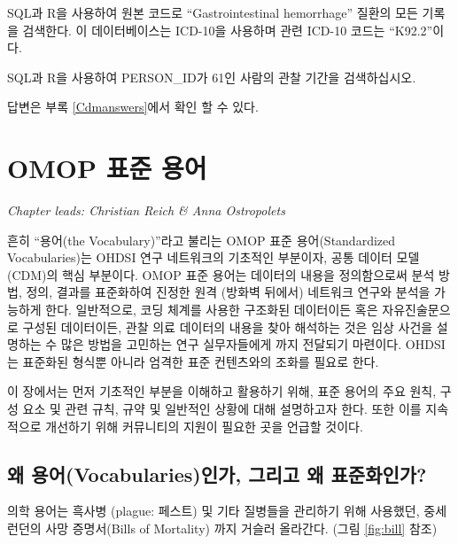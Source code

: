 \documentclass[11pt]{book}
\theoremstyle{definition}
\theoremstyle{definition}
\theoremstyle{definition}
\theoremstyle{remark}
\let\BeginKnitrBlock\begin \let\EndKnitrBlock\end
\begin{document}
\BeginKnitrBlock{exercise}
\protect\hypertarget{exr:exercisePersonSource}{}{\label{exr:exercisePersonSource}
}SQL과 R을 사용하여 원본 코드로 ``Gastrointestinal hemorrhage'' 질환의
모든 기록을 검색한다. 이 데이터베이스는 ICD-10을 사용하며 관련 ICD-10
코드는 ``K92.2''이다.
\EndKnitrBlock{exercise}

\BeginKnitrBlock{exercise}
\protect\hypertarget{exr:exercisePerson61Records}{}{\label{exr:exercisePerson61Records}
}SQL과 R을 사용하여 PERSON\_ID가 61인 사람의 관찰 기간을 검색하십시오.
\EndKnitrBlock{exercise}

답변은 부록 \ref{Cdmanswers}에서 확인 할 수 있다.

\chapter{OMOP 표준 용어}\label{StandardizedVocabularies}


\emph{Chapter leads: Christian Reich \& Anna Ostropolets}

흔히 ``용어(the Vocabulary)''라고 불리는 OMOP 표준 용어(Standardized
Vocabularies)는 OHDSI 연구 네트워크의 기초적인 부분이자, 공통 데이터
모델(CDM)의 핵심 부분이다. OMOP 표준 용어는 데이터의 내용을 정의함으로써
분석 방법, 정의, 결과를 표준화하여 진정한 원격 (방화벽 뒤에서) 네트워크
연구와 분석을 가능하게 한다. 일반적으로, 코딩 체계를 사용한 구조화된
데이터이든 혹은 자유진술문으로 구성된 데이터이든, 관찰 의료 데이터의
내용을 찾아 해석하는 것은 임상 사건을 설명하는 수 많은 방법을 고민하는
연구 실무자들에게 까지 전달되기 마련이다. OHDSI는 표준화된 형식뿐 아니라
엄격한 표준 컨텐츠와의 조화를 필요로 한다.

이 장에서는 먼저 기초적인 부분을 이해하고 활용하기 위해, 표준 용어의
주요 원칙, 구성 요소 및 관련 규칙, 규약 및 일반적인 상황에 대해
설명하고자 한다. 또한 이를 지속적으로 개선하기 위해 커뮤니티의 지원이
필요한 곳을 언급할 것이다.

\section{왜 용어(Vocabularies)인가, 그리고 왜
표준화인가?}\label{-vocabularies---}

의학 용어는 흑사병 (plague: 페스트) 및 기타 질병들을 관리하기 위해
사용했던, 중세 런던의 사망 증명서(Bills of Mortality) 까지 거슬러
올라간다. (그림 \ref{fig:bill} 참조) 
\end{document}
